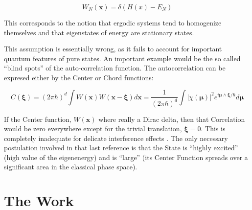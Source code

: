 \documentclass[a4paper,12pt]{article}
\newcommand{\xfase}{\mathbf{x}}
\newcommand{\xifase}{ {\boldsymbol{\xi}} }
\newcommand{\mufase}{ {\boldsymbol{\mu}} }
\begin{document}
\begin{equation}
W_N(\xfase)=\delta (H(x)-E_N)
\end{equation}

This corresponds to the notion that ergodic systems tend to 
homogenize themselves and that eigenstates of energy are
stationary states.

This assumption is essentially wrong, as it fails to account
for important quantum features of pure states. An important example would
be the so called ``blind spots'' \cite{Zambrano09} 
of the auto-correlation function.  The autocorrelation can be 
expresed either by the Center or Chord functions:

\begin{equation}
C(\xifase)=(2\pi\hbar)^d \int W(\xfase)W(\xfase-\xifase) d\xfase
=\frac{1}{(2\pi\hbar)^d}\int |\chi(\mufase)|^2 e^{i\mufase\wedge\xifase/\hbar}
d\mufase
\end{equation}

If the Center function, $W(\xfase)$ where really a Dirac delta,
then that Correlation would be zero everywhere except for 
the trivial translation,  $\xifase=0$. This is completely
inadequate for delicate interference effects \cite{Zambrano08}.
The only necessary postulation involved in that
last reference  is that the
State is ``highly excited'' (high value of the eigenenergy) 
and is ``large'' (its Center Function spreads over a significant 
area in
the classical phase space).

\section{The Work}
\end{document}
